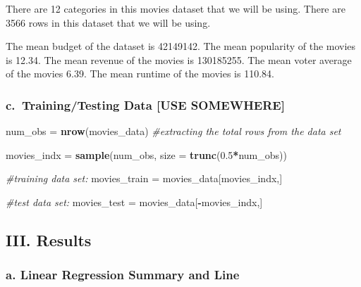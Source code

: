 \documentclass[
]{article}
\newenvironment{Shaded}{\begin{snugshade}}{\end{snugshade}}
\newcommand{\AttributeTok}[1]{\textcolor[rgb]{0.13,0.29,0.53}{#1}}
\newcommand{\CommentTok}[1]{\textcolor[rgb]{0.56,0.35,0.01}{\textit{#1}}}
\newcommand{\FloatTok}[1]{\textcolor[rgb]{0.00,0.00,0.81}{#1}}
\newcommand{\FunctionTok}[1]{\textcolor[rgb]{0.13,0.29,0.53}{\textbf{#1}}}
\newcommand{\NormalTok}[1]{#1}
\newcommand{\OtherTok}[1]{\textcolor[rgb]{0.56,0.35,0.01}{#1}}
\newcommand{\SpecialCharTok}[1]{\textcolor[rgb]{0.81,0.36,0.00}{\textbf{#1}}}
\begin{document}
There are 12 categories in this movies dataset that we will be using.
There are 3566 rows in this dataset that we will be using.

The mean budget of the dataset is 42149142. The mean popularity of the
movies is 12.34. The mean revenue of the movies is 130185255. The mean
voter average of the movies 6.39. The mean runtime of the movies is
110.84.

\subsubsection{c.~Training/Testing Data {[}USE
SOMEWHERE{]}}\label{c.-trainingtesting-data-use-somewhere}

\begin{Shaded}
\begin{Highlighting}[]
\NormalTok{num\_obs }\OtherTok{=} \FunctionTok{nrow}\NormalTok{(movies\_data)  }\CommentTok{\#extracting the total rows from the data set}

\NormalTok{movies\_indx }\OtherTok{=} \FunctionTok{sample}\NormalTok{(num\_obs, }\AttributeTok{size =} \FunctionTok{trunc}\NormalTok{(}\FloatTok{0.5}\SpecialCharTok{*}\NormalTok{num\_obs))}

\CommentTok{\#training data set:}
\NormalTok{movies\_train }\OtherTok{=}\NormalTok{ movies\_data[movies\_indx,]}

\CommentTok{\#test data set:}
\NormalTok{movies\_test }\OtherTok{=}\NormalTok{ movies\_data[}\SpecialCharTok{{-}}\NormalTok{movies\_indx,]}
\end{Highlighting}
\end{Shaded}

\subsection{III. Results}\label{iii.-results}

\subsubsection{a. Linear Regression Summary and
Line}\label{a.-linear-regression-summary-and-line}
\end{document}

